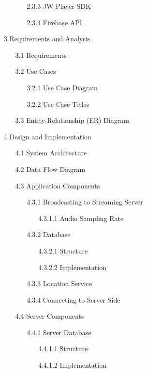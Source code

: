 \documentclass{article}
\begin{document}
\begin{itemize}
\begin{itemize}
\begin{itemize}
			\item [2.3.3] JW Player SDK
			\item [2.3.4] Firebase API
		\end{itemize}
	\end{itemize}
    	\item [3] Requirements and Analysis
	\begin{itemize}
		\item [3.1] Requirements
		\item [3.2] Use Cases
		\begin{itemize}
			\item [3.2.1] Use Case Diagram
			\item [3.2.2] Use Case Titles
		\end{itemize}
		\item [3.3] Entity-Relationship (ER) Diagram
	\end{itemize}
	\item [4] Design and Implementation
	\begin{itemize}
		\item [4.1] System Architecture
		\item [4.2] Data Flow Diagram
		\item [4.3] Application Components
		\begin{itemize}
			\item [4.3.1] Broadcasting to Streaming Server
			\begin{itemize}
				\item [4.3.1.1] Audio Sampling Rate
			\end{itemize}
			\item [4.3.2] Database
			\begin{itemize}
				\item [4.3.2.1] Structure
				\item [4.3.2.2] Implementation
			\end{itemize}
			\item [4.3.3] Location Service
			\item [4.3.4] Connecting to Server Side
		\end{itemize}
		\item [4.4] Server Components
		\begin{itemize}
			\item [4.4.1] Server Database
			\begin{itemize}
				\item [4.4.1.1] Structure
				\item [4.4.1.2] Implementation
			\end{itemize}

\end{itemize}
\end{itemize}
\end{itemize}
\end{document}

